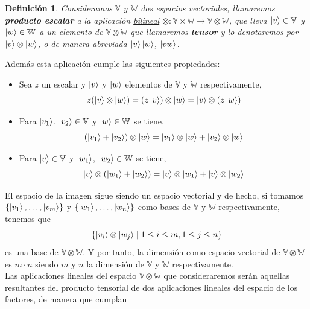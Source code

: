 \documentclass[a4paper]{article}
\newtheorem{deff}{Definición}[section]
\numberwithin{equation}{section}
\begin{document}
\begin{deff}
Consideramos $\mathbb{V}$ y $\mathbb{W}$ dos espacios vectoriales, llamaremos \textbf{producto escalar} a la aplicación \underline{bilineal} $\otimes : \mathbb{V}\times \mathbb{W} \longrightarrow \mathbb{V}\otimes \mathbb{W}$, que lleva $\ket{v} \in \mathbb{V}$ y $\ket{w} \in \mathbb{W}$ a un elemento de $\mathbb{V} \otimes \mathbb{W}$ que llamaremos \textbf{tensor} y lo denotaremos por $\ket{v}\otimes \ket{w}$, o de manera abreviada $\ket{v}\ket{w}$, $\ket{vw}$.
\end{deff}
Además esta aplicación cumple las siguientes propiedades:
\begin{itemize}
\item Sea $z$ un escalar y $\ket{v}$ y $\ket{w}$ elementos de $\mathbb{V}$ y $\mathbb{W}$ respectivamente,
\begin{equation}
z(\ket{v}\otimes\ket{w}) = (z\ket{v})\otimes\ket{w} = \ket{v}\otimes(z\ket{w})
\end{equation}

\item Para $\ket{v_1}$, $\ket{v_2} \in \mathbb{V}$ y $\ket{w} \in \mathbb{W}$ se tiene,
\begin{equation}
(\ket{v_1} + \ket{v_2}) \otimes \ket{w} = \ket{v_1}\otimes\ket{w} + \ket{v_2}\otimes\ket{w}
\end{equation}

\item Para $\ket{v} \in \mathbb{V}$ y $\ket{w_1}$, $\ket{w_2} \in \mathbb{W}$ se tiene,
\begin{equation}
\ket{v}\otimes (\ket{w_1} +  \ket{w_2}) = \ket{v}\otimes\ket{w_1} + \ket{v}\otimes\ket{w_2}
\end{equation}

\end{itemize}
El espacio de la imagen sigue siendo un espacio vectorial y de hecho, si tomamos $\lbrace \ket{v_1}, \ldots, \ket{v_m} \rbrace$ y $\lbrace \ket{w_1}, \ldots, \ket{w_n} \rbrace$ como bases de $\mathbb{V}$ y $\mathbb{W}$ respectivamente, tenemos que
\begin{equation}
\lbrace \ket{v_i}\otimes\ket{w_j} \mid 1\leq i \leq m, 1\leq j \leq n \rbrace
\end{equation}
es una base de $\mathbb{V}\otimes\mathbb{W}$. Y por tanto, la dimensión como espacio vectorial de $\mathbb{V}\otimes\mathbb{W}$ es $m\cdot n$ siendo $m$ y $n$ la dimensión de $\mathbb{V}$ y $\mathbb{W}$ respectivamente.
\\
Las aplicaciones lineales del espacio $\mathbb{V}\otimes\mathbb{W}$ que consideraremos serán aquellas resultantes del producto tensorial de dos aplicaciones lineales del espacio de los factores, de manera que cumplan
\end{document}
